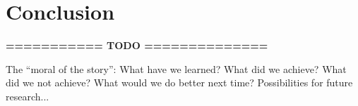 \documentclass[11pt,letterpaper]{article}       %
\begin{document}
\section{Conclusion} \label{concl}

\textbf{=========== TODO ==============}

The ``moral of the story'': What have we learned? What did we achieve?
What did we not achieve? What would we do better next time? Possibilities
for future research...



\end{document}
